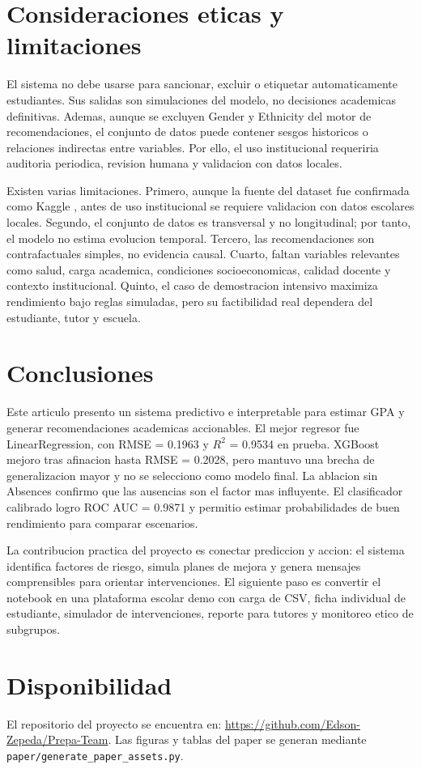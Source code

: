 \documentclass[12pt,onecolumn]{IEEEtran}
\begin{document}
\section{Consideraciones eticas y limitaciones}

El sistema no debe usarse para sancionar, excluir o etiquetar automaticamente estudiantes. Sus salidas son simulaciones del modelo, no decisiones academicas definitivas. Ademas, aunque se excluyen Gender y Ethnicity del motor de recomendaciones, el conjunto de datos puede contener sesgos historicos o relaciones indirectas entre variables. Por ello, el uso institucional requeriria auditoria periodica, revision humana y validacion con datos locales.

Existen varias limitaciones. Primero, aunque la fuente del dataset fue confirmada como Kaggle \cite{kharoua2024students}, antes de uso institucional se requiere validacion con datos escolares locales. Segundo, el conjunto de datos es transversal y no longitudinal; por tanto, el modelo no estima evolucion temporal. Tercero, las recomendaciones son contrafactuales simples, no evidencia causal. Cuarto, faltan variables relevantes como salud, carga academica, condiciones socioeconomicas, calidad docente y contexto institucional. Quinto, el caso de demostracion intensivo maximiza rendimiento bajo reglas simuladas, pero su factibilidad real dependera del estudiante, tutor y escuela.

\section{Conclusiones}

Este articulo presento un sistema predictivo e interpretable para estimar GPA y generar recomendaciones academicas accionables. El mejor regresor fue LinearRegression, con RMSE = 0.1963 y $R^2$ = 0.9534 en prueba. XGBoost mejoro tras afinacion hasta RMSE = 0.2028, pero mantuvo una brecha de generalizacion mayor y no se selecciono como modelo final. La ablacion sin Absences confirmo que las ausencias son el factor mas influyente. El clasificador calibrado logro ROC AUC = 0.9871 y permitio estimar probabilidades de buen rendimiento para comparar escenarios.

La contribucion practica del proyecto es conectar prediccion y accion: el sistema identifica factores de riesgo, simula planes de mejora y genera mensajes comprensibles para orientar intervenciones. El siguiente paso es convertir el notebook en una plataforma escolar demo con carga de CSV, ficha individual de estudiante, simulador de intervenciones, reporte para tutores y monitoreo etico de subgrupos.

\section*{Disponibilidad}

El repositorio del proyecto se encuentra en: \url{https://github.com/Edson-Zepeda/Prepa-Team}. Las figuras y tablas del paper se generan mediante \texttt{paper/generate\_paper\_assets.py}.



\end{document}
